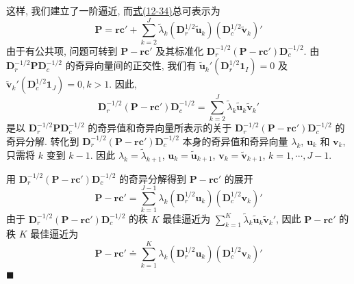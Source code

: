 这样, 我们建立了一阶逼近, 而\hyperref[eq:12-34]{式(12-34)}总可表示为
\[
\mathbf{P}=\mathbf{r}\mathbf{c}'+\sum_{k=2}^{J}\tilde{\lambda}_k(\mathbf{D}_r^{1/2}\tilde{\mathbf{u}}_k)(\mathbf{D}_c^{1/2}\tilde{\mathbf{v}}_k)'
\]
由于有公共项, 问题可转到 $\mathbf{P}-\mathbf{r}\mathbf{c}'$ 及其标准化 $\mathbf{D}_r^{-1/2}(\mathbf{P}-\mathbf{r}\mathbf{c}')\mathbf{D}_c^{-1/2}$. 由 $\mathbf{D}_r^{-1/2}\mathbf{P}\mathbf{D}_c^{-1/2}$ 的奇异向量间的正交性, 我们有 $\tilde{\mathbf{u}}_k'(\mathbf{D}_r^{1/2}\mathbf{1}_I)=0$ 及 $\tilde{\mathbf{v}}_k'(\mathbf{D}_c^{1/2}\mathbf{1}_J)=0, k>1$. 因此,
\[
\mathbf{D}_r^{-1/2}(\mathbf{P}-\mathbf{r}\mathbf{c}')\mathbf{D}_c^{-1/2}
=\sum_{k=2}^{J}\tilde{\lambda}_k\tilde{\mathbf{u}}_k\tilde{\mathbf{v}}_k'
\]
是以 $\mathbf{D}_r^{-1/2}\mathbf{P}\mathbf{D}_c^{-1/2}$ 的奇异值和奇异向量所表示的关于 $\mathbf{D}_r^{-1/2}(\mathbf{P}-\mathbf{r}\mathbf{c}')\mathbf{D}_c^{-1/2}$ 的奇异分解. 转化到 $\mathbf{D}_r^{-1/2}(\mathbf{P}-\mathbf{r}\mathbf{c}')\mathbf{D}_c^{-1/2}$ 本身的奇异值和奇异向量 $\lambda_k$, $\mathbf{u}_k$ 和 $\mathbf{v}_k$, 只需将 $k$ 变到 $k-1$. 因此 $\lambda_k=\tilde{\lambda}_{k+1}$, $\mathbf{u}_k=\tilde{\mathbf{u}}_{k+1}$, $\mathbf{v}_k=\tilde{\mathbf{v}}_{k+1}$, $k=1,\cdots,J-1$.

用 $\mathbf{D}_r^{-1/2}(\mathbf{P}-\mathbf{r}\mathbf{c}')\mathbf{D}_c^{-1/2}$ 的奇异分解得到 $\mathbf{P}-\mathbf{r}\mathbf{c}'$ 的展开
\label{eq:12-37}
\begin{equation}
\mathbf{P}-\mathbf{r}\mathbf{c}'=\sum_{k=1}^{J-1}\lambda_k(\mathbf{D}_r^{1/2}\mathbf{u}_k)(\mathbf{D}_c^{1/2}\mathbf{v}_k)'
\tag{12-37}
\end{equation}
由于 $\mathbf{D}_r^{-1/2}(\mathbf{P}-\mathbf{r}\mathbf{c}')\mathbf{D}_c^{-1/2}$ 的秩 $K$ 最佳逼近为 $\sum_{k=1}^{K}\tilde{\lambda}_k\tilde{\mathbf{u}}_k\tilde{\mathbf{v}}_k'$, 因此 $\mathbf{P}-\mathbf{r}\mathbf{c}'$ 的秩 $K$ 最佳逼近为
\label{eq:12-38}
\begin{equation}
\mathbf{P}-\mathbf{r}\mathbf{c}'\doteq\sum_{k=1}^{K}\lambda_k(\mathbf{D}_r^{1/2}\mathbf{u}_k)(\mathbf{D}_c^{1/2}\mathbf{v}_k)'
\tag{12-38}
\end{equation}
\hfill$\blacksquare$

